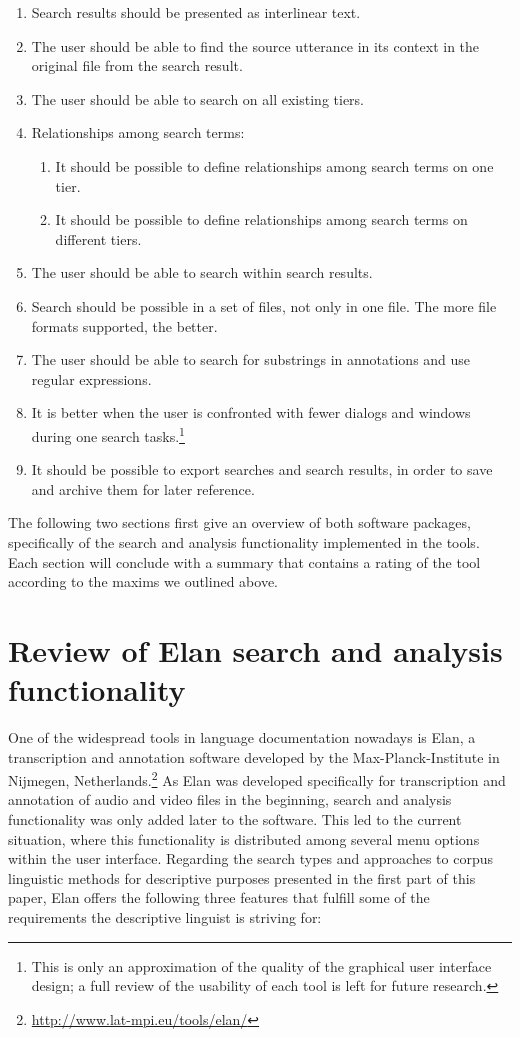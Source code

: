\begin{enumerate}
\item Search results should be presented as interlinear text.
\item The user should be able to find the source utterance in its context in the original file from the search result.
\item The user should be able to search on all existing tiers.
\item Relationships among search terms:
 \begin{enumerate}
 \item It should be possible to define relationships among search terms on one tier.
 \item It should be possible to define relationships among search terms on different tiers.
 \end{enumerate}
\item The user should be able to search within search results.
\item Search should be possible in a set of files, not only in one file. The more file formats supported, the better.
\item The user should be able to search for substrings in annotations and use regular expressions.
\item It is better when the user is confronted with fewer dialogs and windows during one search tasks.\footnote{ This is only an approximation of the quality of the graphical user interface design; a full review of the usability of each tool is left for future research.}
\item It should be possible to export searches and search results, in order to save and archive them for later reference.
\end{enumerate}

The following two sections first give an overview of both software packages, specifically of the search and analysis functionality implemented in the tools. Each section will conclude with a summary that contains a rating of the tool according to the maxims we outlined above.

\section{Review of Elan search and analysis functionality}

One of the widespread tools in language documentation nowadays is Elan, a transcription and annotation software developed by the Max-Planck-Institute in Nijmegen, Netherlands.\footnote{\url{http://www.lat-mpi.eu/tools/elan/}} As Elan was developed specifically for transcription and annotation of audio and video files in the beginning, search and analysis functionality was only added later to the software. This led to the current situation, where this functionality is distributed among several menu options within the user interface. Regarding the search types and approaches to corpus linguistic methods for descriptive purposes presented in the first part of this paper, Elan offers the following three features that fulfill some of the requirements the descriptive linguist is striving for:

